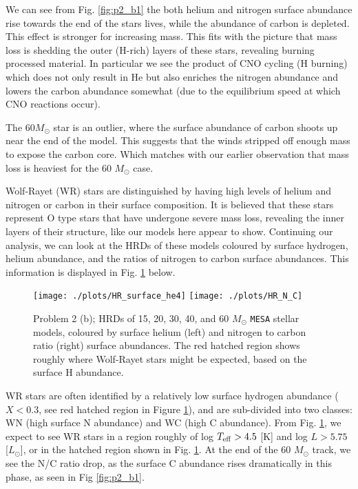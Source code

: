 \documentclass[11pt]{article}
\newcommand{\msol}{M_\odot}
\begin{document}
We can see from Fig. \ref{fig:p2_b1}  the both helium and nitrogen surface abundance rise towards the end of the stars lives, while the abundance of carbon is depleted.  This effect is stronger for increasing mass. This fits with the picture that mass loss is shedding the outer (H-rich) layers of these stars, revealing burning processed material. In particular we see the product of CNO cycling (H burning) which does not only result in He but also enriches the nitrogen abundance and lowers the carbon abundance somewhat (due to the equilibrium speed at which CNO reactions occur). 

The 60$M_{\odot}$ star is an outlier, where the surface abundance of carbon shoots up near the end of the model. This suggests that the winds stripped off enough mass to expose the carbon core. Which matches with our earlier observation that mass loss is heaviest for the  60 $\msol$ case.

Wolf-Rayet (WR) stars are distinguished by having high levels of helium and nitrogen or carbon in their surface composition. It is believed that these stars represent O type stars that have undergone severe mass loss, revealing the inner layers of their structure, like our models here appear to show.  Continuing our analysis, we can look at the HRDs of these models coloured by surface hydrogen, helium abundance, and the ratios of nitrogen to carbon surface abundances. This information is displayed in Fig.  \ref{fig:p2_b2} below.

\begin{figure}
\center
\texttt{[image: ./plots/HR\_surface\_he4]}
\texttt{[image: ./plots/HR\_N\_C]}
    \caption{Problem 2 (b); HRDs of 15, 20, 30, 40, and 60 $\msol$  \texttt{MESA} stellar models, coloured by surface helium (left) and nitrogen to carbon ratio (right) surface abundances. The red hatched region shows roughly where Wolf-Rayet stars might be expected, based on the surface H abundance.}
    \label{fig:p2_b2}
\end{figure}


WR stars are often identified by a relatively low surface hydrogen abundance ($X<0.3$, see red hatched region in Figure \ref{fig:p2_b2}), and are sub-divided into two classes: WN (high surface N abundance) and WC (high C abundance). From Fig. \ref{fig:p2_b2},  we expect to see WR stars in a region roughly of log $T_{\rm{eff}} > 4.5$ [K] and log $L > 5.75$ [$L_{\odot}$], or in the hatched region shown in Fig. \ref{fig:p2_b2}. At the end of the 60 $\msol$ track, we see the N/C ratio drop, as the surface C abundance rises dramatically in this phase, as seen in Fig \ref{fig:p2_b1}.
\end{document}

